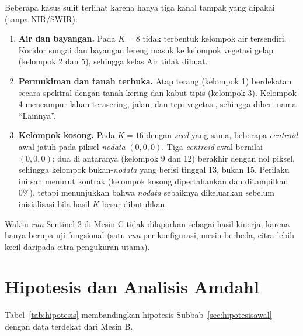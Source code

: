 Beberapa kasus sulit terlihat karena hanya tiga kanal tampak yang dipakai (tanpa NIR/SWIR):
\begin{enumerate}
    \item \textbf{Air dan bayangan.} Pada $K=8$ tidak terbentuk kelompok air tersendiri. Koridor sungai dan bayangan lereng masuk ke kelompok vegetasi gelap (kelompok 2 dan 5), sehingga kelas Air tidak dibuat.
    \item \textbf{Permukiman dan tanah terbuka.} Atap terang (kelompok 1) berdekatan secara spektral dengan tanah kering dan kabut tipis (kelompok 3). Kelompok 4 mencampur lahan terasering, jalan, dan tepi vegetasi, sehingga diberi nama ``Lainnya''.
    \item \textbf{Kelompok kosong.} Pada $K=16$ dengan \emph{seed} yang sama, beberapa \emph{centroid} awal jatuh pada piksel \emph{nodata} $(0,0,0)$. Tiga \emph{centroid} awal bernilai $(0,0,0)$; dua di antaranya (kelompok 9 dan 12) berakhir dengan nol piksel, sehingga kelompok bukan-\emph{nodata} yang berisi tinggal 13, bukan 15. Perilaku ini sah menurut kontrak (kelompok kosong dipertahankan dan ditampilkan 0\%), tetapi menunjukkan bahwa \emph{nodata} sebaiknya dikeluarkan sebelum inisialisasi bila hasil $K$ besar dibutuhkan.
\end{enumerate}

Waktu \emph{run} Sentinel-2 di Mesin C tidak dilaporkan sebagai hasil kinerja, karena hanya berupa uji fungsional (satu \emph{run} per konfigurasi, mesin berbeda, citra lebih kecil daripada citra pengukuran utama).

\section{Hipotesis dan Analisis Amdahl}
\label{sec:hipotesis}
Tabel~\ref{tab:hipotesis} membandingkan hipotesis Subbab~\ref{sec:hipotesisawal} dengan data terdekat dari Mesin B.

